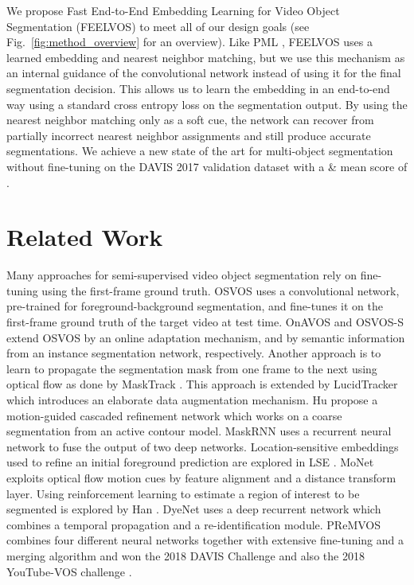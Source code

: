 \documentclass[10pt,twocolumn,letterpaper]{article}
\newcommand{\PARbegin}[1]{\noindent {\bf #1~}}
\begin{document}
We propose Fast End-to-End Embedding Learning for Video Object Segmentation (FEELVOS) to meet all of our design goals (see Fig.~\ref{fig:method_overview} for an overview). Like PML \cite{Chen18CVPR}, FEELVOS uses a learned embedding and nearest neighbor matching, but we use this mechanism as an internal guidance of the convolutional network instead of using it for the final segmentation decision. This allows us to learn the embedding in an end-to-end way using a standard cross entropy loss on the segmentation output. By using the nearest neighbor matching only as a soft cue, the network can recover from partially incorrect nearest neighbor assignments and still produce accurate segmentations. We achieve a new state of the art for multi-object segmentation without fine-tuning on the DAVIS 2017 validation dataset with a \& mean score of . 

\section{Related Work}\label{sec:related-work}

\PARbegin{Video Object Segmentation with First-Frame Fine-tuning.}
Many approaches for semi-supervised video object segmentation rely on fine-tuning using the first-frame ground truth. 
OSVOS \cite{OSVOS} uses a convolutional network, pre-trained for foreground-background segmentation, and fine-tunes it on the first-frame ground truth of the target video at test time. 
OnAVOS \cite{voigtlaender17BMVC, voigtlaender17DAVIS} and OSVOS-S \cite{Maninis18TPAMI} extend OSVOS by an online adaptation mechanism, and by semantic information from an instance segmentation network, respectively.
Another approach is to learn to propagate the segmentation mask from one frame to the next using optical flow as done by MaskTrack \cite{masktrack}.  This approach is extended by LucidTracker \cite{lucidtracker} which introduces an elaborate data augmentation mechanism. 
Hu \etal \cite{Hu18CVPR} propose a motion-guided cascaded refinement network which  works on a coarse segmentation from an active contour model. MaskRNN \cite{Hu17NIPS} uses a recurrent neural network to fuse the output of two deep networks. 
Location-sensitive embeddings used to refine an initial foreground prediction are explored in LSE \cite{Ci18ECCV}.
MoNet \cite{Xiao18CVPR} exploits optical flow motion cues by feature alignment and a distance transform layer.
Using reinforcement learning to estimate a region of interest to be segmented is explored by 
Han \etal \cite{Han18CVPR}. DyeNet \cite{Li18ECCV} uses a deep recurrent network which combines a temporal propagation and a re-identification module. 
PReMVOS \cite{Luiten18ACCV, Luiten18DAVIS, Luiten18ECCVW} combines four different neural networks together with extensive fine-tuning and a merging algorithm and won the 2018 DAVIS Challenge \cite{Caelles18Arxiv} and also the 2018 YouTube-VOS challenge \cite{Xu18ECCV}.
\end{document}
